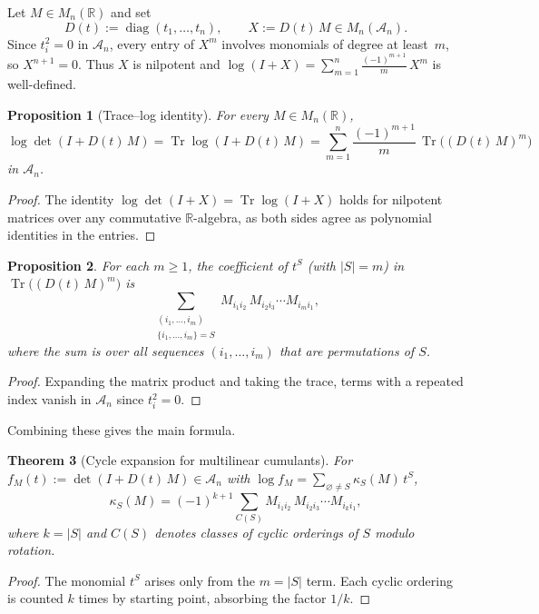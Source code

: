 \documentclass[11pt]{amsart}
\newtheorem{thm}{Theorem}[section]
\newtheorem{prop}[thm]{Proposition}
\theoremstyle{definition}
\newcommand{\R}{\mathbb{R}}
\DeclareMathOperator{\Tr}{Tr}
\DeclareMathOperator{\diag}{diag}
\begin{document}
Let $M\in M_n(\R)$ and set
\[
  D(t) := \diag(t_1,\dots,t_n),
  \qquad
  X := D(t)\, M \in M_n(\mathcal{A}_n).
\]
Since $t_i^2 = 0$ in $\mathcal{A}_n$, every entry of $X^m$ involves monomials of degree at least~$m$, so $X^{n+1} = 0$. Thus $X$ is nilpotent and $\log(I+X) = \sum_{m=1}^n \frac{(-1)^{m+1}}{m}\, X^m$ is well-defined.

\begin{prop}[Trace--log identity]
\label{prop:trace-log}
For every $M\in M_n(\R)$,
\[
  \log\det(I + D(t)\, M)
  = \Tr\log(I + D(t)\, M)
  = \sum_{m=1}^n \frac{(-1)^{m+1}}{m}\,
  \Tr\bigl((D(t)\, M)^m\bigr)
\]
in $\mathcal{A}_n$.
\end{prop}

\begin{proof}
The identity $\log\det(I+X) = \Tr\log(I+X)$ holds for nilpotent matrices over any commutative $\R$-algebra, as both sides agree as polynomial identities in the entries.
\end{proof}

\begin{prop}\label{prop:trace-cycle}
For each $m\ge 1$, the coefficient of $t^S$ (with $|S|=m$) in
$\Tr\bigl((D(t)\, M)^m\bigr)$ is
\[
  \sum_{\substack{(i_1,\dots,i_m)\\
  \{i_1,\dots,i_m\}=S}}
  M_{i_1 i_2}\, M_{i_2 i_3}\cdots M_{i_m i_1},
\]
where the sum is over all sequences $(i_1,\dots,i_m)$ that are
permutations of $S$.
\end{prop}

\begin{proof}
Expanding the matrix product and taking the trace, terms with
a repeated index vanish in $\mathcal{A}_n$ since $t_i^2=0$.
\end{proof}

Combining these gives the main formula.

\begin{thm}[Cycle expansion for multilinear cumulants]
\label{thm:cycle-expansion}
For $f_M(t) := \det(I+D(t)\, M)\in\mathcal{A}_n$ with
$\log f_M = \sum_{\varnothing\neq S} \kappa_S(M)\, t^S$,
\[
  \kappa_S(M)
  = (-1)^{k+1}
  \sum_{C(S)}
  M_{i_1 i_2}\, M_{i_2 i_3}\cdots M_{i_k i_1},
\]
where $k=|S|$ and $C(S)$ denotes classes of cyclic orderings of $S$ modulo rotation.
\end{thm}

\begin{proof}
The monomial $t^S$ arises only from the $m=|S|$ term.  Each
cyclic ordering is counted $k$ times by starting point, absorbing
the factor $1/k$.
\end{proof}
\end{document}
